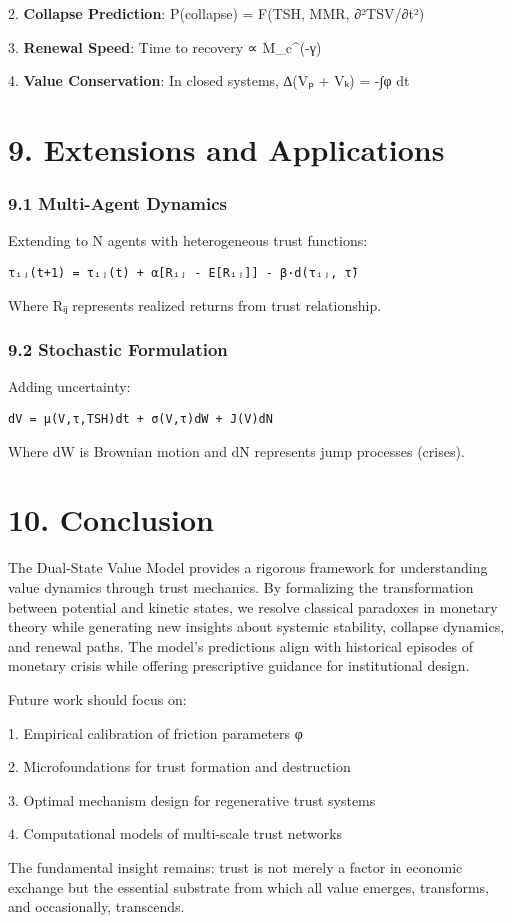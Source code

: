 \documentclass[11pt,oneside]{book}
\begin{document}
2. \textbf{Collapse Prediction}: P(collapse) = F(TSH, MMR, ∂²TSV/∂t²)


3. \textbf{Renewal Speed}: Time to recovery ∝ M_c^(-γ)


4. \textbf{Value Conservation}: In closed systems, ∆(Vₚ + Vₖ) = -∫φ dt


\section{9. Extensions and Applications}

\subsubsection{9.1 Multi-Agent Dynamics}

Extending to N agents with heterogeneous trust functions:

\begin{verbatim}
τᵢⱼ(t+1) = τᵢⱼ(t) + α[Rᵢⱼ - E[Rᵢⱼ]] - β·d(τᵢⱼ, τ̄)
\end{verbatim}

Where Rᵢⱼ represents realized returns from trust relationship.

\subsubsection{9.2 Stochastic Formulation}

Adding uncertainty:

\begin{verbatim}
dV = μ(V,τ,TSH)dt + σ(V,τ)dW + J(V)dN
\end{verbatim}

Where dW is Brownian motion and dN represents jump processes (crises).

\section{10. Conclusion}

The Dual-State Value Model provides a rigorous framework for understanding value dynamics through trust mechanics. By formalizing the transformation between potential and kinetic states, we resolve classical paradoxes in monetary theory while generating new insights about systemic stability, collapse dynamics, and renewal paths. The model's predictions align with historical episodes of monetary crisis while offering prescriptive guidance for institutional design.

Future work should focus on:

1. Empirical calibration of friction parameters φ


2. Microfoundations for trust formation and destruction


3. Optimal mechanism design for regenerative trust systems


4. Computational models of multi-scale trust networks


The fundamental insight remains: trust is not merely a factor in economic exchange but the essential substrate from which all value emerges, transforms, and occasionally, transcends.




\end{document}
